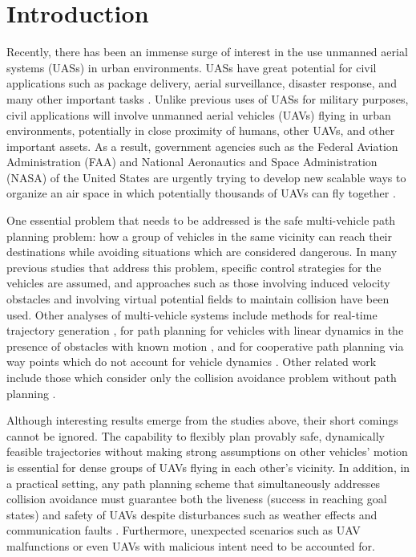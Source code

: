 \section{Introduction}
Recently, there has been an immense surge of interest in the use unmanned aerial systems (UASs) in urban environments. UASs have great potential for civil applications such as package delivery, aerial surveillance, disaster response, and many other important tasks \cite{Tice91, Debusk10, Amazon16, AUVSI16, BBC16}. Unlike previous uses of UASs for military purposes, civil applications will involve unmanned aerial vehicles (UAVs) flying in urban environments, potentially in close proximity of humans, other UAVs, and other important assets. As a result, government agencies such as the Federal Aviation Administration (FAA) and National Aeronautics and Space Administration (NASA) of the United States are urgently trying to develop new scalable ways to organize an air space in which potentially thousands of UAVs can fly together \cite{FAA13, NASA16, Kopardekar16}.

One essential problem that needs to be addressed is the safe multi-vehicle path planning problem: how a group of vehicles in the same vicinity can reach their destinations while avoiding situations which are considered dangerous. In many previous studies that address this problem, specific control strategies for the vehicles are assumed, and approaches such as those involving induced velocity obstacles \cite{Fiorini98, Chasparis05, Vandenberg08} and involving virtual potential fields to maintain collision \cite{Olfati-Saber2002, Chuang07} have been used. Other analyses of multi-vehicle systems include methods for real-time trajectory generation \cite{Feng-LiLian2002}, for path planning for vehicles with linear dynamics in the presence of obstacles with known motion \cite{Ahmadzadeh2009}, and for cooperative path planning via way points which do not account for vehicle dynamics \cite{Bellingham}. Other related work include those which consider only the collision avoidance problem without path planning \cite{Lalish2008, Hoffmann2008, Chen2016}.

Although interesting results emerge from the studies above, their short comings cannot be ignored. The capability to flexibly plan provably safe, dynamically feasible trajectories without making strong assumptions on other vehicles' motion is essential for dense groups of UAVs flying in each other's vicinity. In addition, in a practical setting, any path planning scheme that simultaneously addresses collision avoidance must guarantee both the liveness (success in reaching goal states) and safety of UAVs despite disturbances such as weather effects and communication faults \cite{Kopardekar16}. Furthermore, unexpected scenarios such as UAV malfunctions or even UAVs with malicious intent need to be accounted for.

